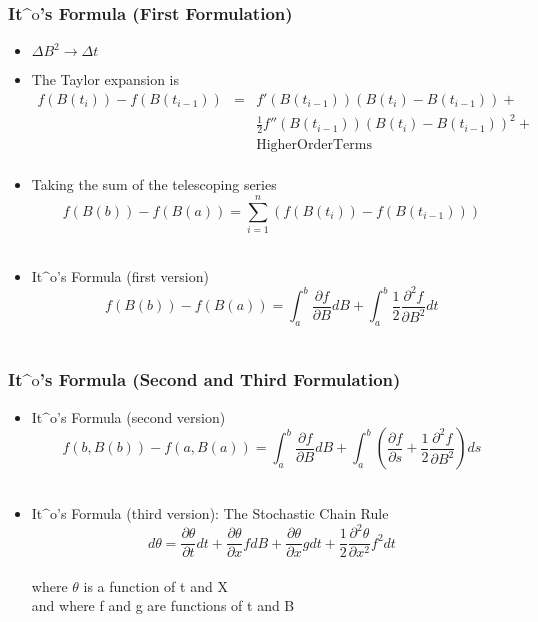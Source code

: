 \begin{frame}
  \frametitle{It$\mathrm{\^o}$'s Formula (First Formulation)}
  \begin{itemize}
  \item $\Delta B^2 \to \Delta t$\\
  \item  The Taylor expansion is
  \begin{eqnarray*}
    f(B(t_i))-f(B(t_{i-1}))&=&f'(B(t_{i-1}))(B(t_i)-B(t_{i-1}))+\\
    & &\frac{1}{2}f''(B(t_{i-1}))(B(t_i)-B(t_{i-1}))^2+\\
    & &\mathrm{Higher Order Terms}\\
  \end{eqnarray*}
  \item Taking the sum of the telescoping series $$f(B(b))-f(B(a))=\sum_{i=1}^{n}(f(B(t_i))-f(B(t_{i-1})))$$\\
  \item It$\mathrm{\^o}$'s Formula (first version) $$f(B(b))-f(B(a))=\int_{a}^{b}{\frac{\partial f}{\partial B} dB}+\int_{a}^{b}{\frac{1}{2} \frac{\partial^2 f}{\partial B^2} dt} $$\\
  \end{itemize}
\end{frame}

\begin{frame}
  \frametitle{It$\mathrm{\^o}$'s Formula (Second and Third Formulation)}
  \begin{itemize}
  \item  It$\mathrm{\^o}$'s Formula (second version) $$f(b,B(b))-f(a,B(a))=\int_{a}^{b}{\frac{\partial f}{\partial B} dB}+\int_{a}^{b}{(\frac{\partial f}{\partial s}+\frac{1}{2}\frac{\partial ^2 f}{\partial B^2}) ds}$$\\
  \item  It$\mathrm{\^o}$'s Formula (third version): The Stochastic Chain Rule $$d\theta=\frac{\partial\theta}{\partial t}dt+\frac{\partial\theta}{\partial x}f dB+\frac{\partial\theta}{\partial x}g dt+\frac{1}{2}\frac{\partial^2\theta}{\partial x^2}f^2dt$$\\
  where $\theta$ is a function of t and X\\
  and where f and g are functions of t and B
  \end{itemize}
  
\end{frame}








\
